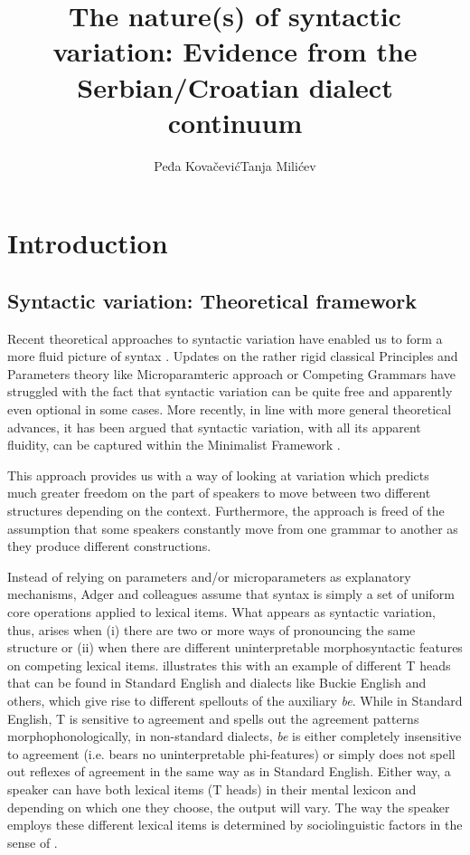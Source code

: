 \documentclass[output=paper,modfonts,newtxmath,hidelinks,]{langscibook}
\title{The nature(s) of syntactic variation: Evidence from the Serbian/Croatian dialect continuum}
\author{Peđa Kovačević\affiliation{University of Novi Sad}\lastand  Tanja Milićev\affiliation{University of Novi Sad}}
\begin{document}
\maketitle
{}

\section{Introduction}\label{7:s1}

\subsection{Syntactic variation: {T}heoretical framework}\label{7:s1.1}

Recent theoretical approaches to syntactic variation have enabled us to form a more fluid picture of syntax \citep{Adger2006,AdgerTrousdale2007,AdgerSmith2005}. Updates on the rather rigid classical Principles and Parameters theory \citep{ChomskyLasnik1995} like   Microparamteric approach or  Competing Grammars have struggled with the fact that syntactic variation can be quite free and apparently even optional in some cases. More recently, in line with more general theoretical advances, it has been argued that syntactic variation, with all its apparent fluidity, can be captured within the Minimalist Framework \citep{Adger2006,AdgerTrousdale2007,AdgerSmith2005}.

This approach provides us with a way of looking at variation which predicts much greater freedom on the part of speakers to move between two different structures depending on the context. Furthermore, the approach is freed of the assumption that some speakers constantly move from one grammar to another as they produce different constructions.\largerpage[2]

Instead of relying on parameters and/or microparameters as explanatory mechanisms, Adger and colleagues assume that syntax is simply a set of uniform core operations applied to lexical items. What appears as syntactic variation, thus, arises when (i) there are two or more ways of pronouncing the same structure or (ii) when there are different uninterpretable morphosyntactic features on competing lexical items. \citet{Adger2006} illustrates this with an example of different T heads that can be found in Standard English and dialects like Buckie English and others, which give rise to different spellouts of the auxiliary \textit{be}. While in Standard English, T is sensitive to agreement and spells out the agreement patterns morphophonologically, in non-standard dialects, \textit{be} is either completely insensitive to agreement (i.e. bears no uninterpretable phi-features) or simply does not spell out reflexes of agreement in the same way as in Standard English. Either way, a speaker can have both lexical items (T heads) in their mental lexicon and depending on which one they choose, the output will vary. The way the speaker employs these different lexical items is determined by sociolinguistic factors in the sense of \citet{Labov1972}.
\end{document}
